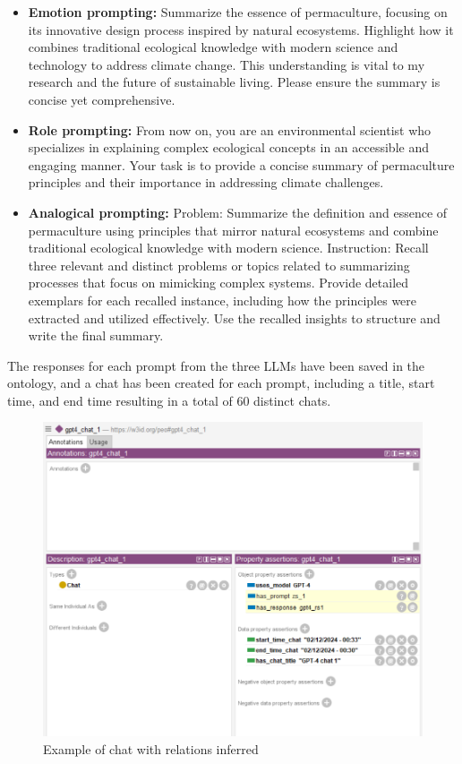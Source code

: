 \begin{itemize}
    \item \textbf{Emotion prompting:} Summarize the essence of permaculture, focusing on its innovative design process inspired by natural ecosystems. Highlight how it combines traditional ecological knowledge with modern science and technology to address climate change. This understanding is vital to my research and the future of sustainable living. Please ensure the summary is concise yet comprehensive.
    \item \textbf{Role prompting:} From now on, you are an environmental scientist who specializes in explaining complex ecological concepts in an accessible and engaging manner. Your task is to provide a concise summary of permaculture principles and their importance in addressing climate challenges.
    \item \textbf{Analogical prompting:} Problem: Summarize the definition and essence of permaculture using principles that mirror natural ecosystems and combine traditional ecological knowledge with modern science. Instruction: Recall three relevant and distinct problems or topics related to summarizing processes that focus on mimicking complex systems. Provide detailed exemplars for each recalled instance, including how the principles were extracted and utilized effectively. Use the recalled insights to structure and write the final summary.
\end{itemize}
The responses for each prompt from the three LLMs have been saved in the ontology, and a chat has been created for each prompt, including a title, start time, and end time resulting in a total of 60 distinct chats.
\begin{figure}[H]
    \centering
    \includegraphics[width=0.75\linewidth]{Figures/fig_32.png}
    \caption{Example of chat with relations inferred}
    \label{fig:enter-label}
\end{figure}

